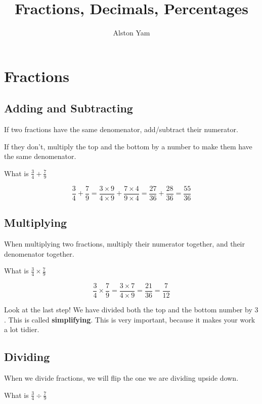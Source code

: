 \documentclass{article}
\title{Fractions, Decimals, Percentages}
\author{Alston Yam}
\date{}
\theoremstyle{mytheoremstyle}
\theoremstyle{mytheoremstyle}
\theoremstyle{myproblemstyle}
\theoremstyle{myproblemstyle}
\begin{document}
    \maketitle

    \section{Fractions}
    \subsection{Adding and Subtracting}

    If two fractions have the same denomenator, add/subtract their numerator.

    If they don't, multiply the top and the bottom by a number to make them have the same denomenator.

    \begin{example}
        What is $\frac{3}{4} + \frac{7}{9}$
    \end{example}

    \[\frac{3}{4} + \frac{7}{9} = \frac{3 \times 9}{4 \times 9} + \frac{7 \times 4}{9 \times 4} = \frac{27}{36} + \frac{28}{36} = \frac{55}{36}\]

    \subsection{Multiplying}

    When multiplying two fractions, multiply their numerator together, and their denomenator together.

    \begin{example}
        What is $\frac{3}{4} \times \frac{7}{9}$
    \end{example}

    \[\frac{3}{4} \times \frac{7}{9} = \frac{3 \times 7}{4 \times 9} = \frac{21}{36} = \frac{7}{12}\]

    Look at the last step! We have divided both the top and the bottom number by $3$. This is called \textbf{simplifying}. This is very important, because it makes your work a lot tidier.

    \subsection{Dividing}

    When we divide fractions, we will flip the one we are dividing upside down.

    \begin{example}
        What is $\frac{3}{4} \div \frac{7}{9}$
    \end{example}
\end{document}
